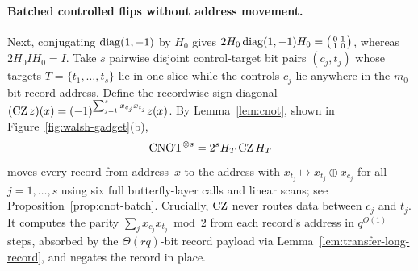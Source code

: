 \paragraph{Batched controlled flips without address movement.}
Next, conjugating $\operatorname{diag}(1,-1)$ by $H_0$ gives $2 H_0\operatorname{diag}(1,-1)H_0 = \bigl(\begin{smallmatrix}0&1\\1&0\end{smallmatrix}\bigr)$, whereas $2 H_0 I H_0 = I$. Take $s$ pairwise disjoint control-target bit pairs $(c_j,t_j)$ whose targets $T=\{t_1,\dots,t_s\}$ lie in one slice while the controls $c_j$ lie anywhere in the $m_0$-bit record address. Define the recordwise sign diagonal $(\mathrm{CZ}\,z)(x)=(-1)^{\sum_{j=1}^s x_{c_j} x_{t_j}}z(x)$. By Lemma~\ref{lem:cnot}, shown in Figure~\ref{fig:walsh-gadget}(b),
\begin{equation}\label{eq:overview-cnot}
  \mathrm{CNOT}^{\otimes s} = 2^s H_T\,\mathrm{CZ}\,H_T
\end{equation}
moves every record from address~$x$ to the address with $x_{t_j}\mapsto x_{t_j}\oplus x_{c_j}$ for all $j=1,\dots,s$ using six full butterfly-layer calls and linear scans; see Proposition~\ref{prop:cnot-batch}. Crucially, $\mathrm{CZ}$ never routes data between $c_j$ and $t_j$. It computes the parity $\sum_j x_{c_j} x_{t_j}\bmod 2$ from each record's address in $q^{O(1)}$ steps, absorbed by the $\Theta(rq)$-bit record payload via Lemma~\ref{lem:transfer-long-record}, and negates the record in place.

